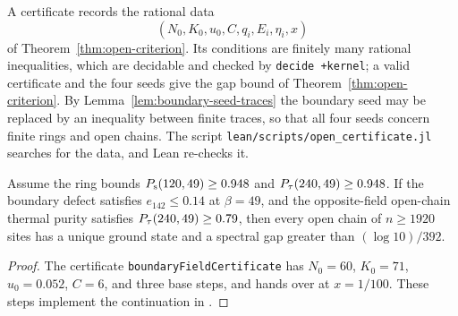 \begin{definition}
  \label{def:open-certificate}
  \leanok
  A certificate records the rational data
  \[
    (N_0, K_0, u_0, C, q_i, E_i, \eta_i, x)
  \]
  of Theorem~\ref{thm:open-criterion}.
  Its conditions are finitely many rational inequalities, which
  are decidable and checked by \texttt{decide +kernel}; a valid certificate and the four seeds give
  the gap bound of Theorem~\ref{thm:open-criterion}. By Lemma~\ref{lem:boundary-seed-traces} the
  boundary seed may be replaced by an inequality between finite traces, so that all four seeds
  concern finite rings and open chains. The script
  \texttt{lean/scripts/open\_certificate.jl} searches for the data, and Lean re-checks it.
\end{definition}

\begin{corollary}
  \label{cor:open-seeds-note}
  \leanok
  Assume the ring bounds \(P_{\mathrm{s}}(120, 49) \ge 0.948\) and \(P_{\tau}(240, 49) \ge 0.948\).
  If the boundary defect
  satisfies \(e_{142} \le 0.14\) at \(\beta = 49\), and the opposite-field open-chain thermal
  purity satisfies \(P_{\tau}(240, 49) \ge 0.79\), then every open chain of \(n \ge 1920\) sites has a
  unique ground state and a spectral gap greater than \((\log 10)/392\).
\end{corollary}
\begin{proof}
  \leanok
  The certificate \texttt{boundaryFieldCertificate} has \(N_0 = 60\), \(K_0 = 71\),
  \(u_0 = 0.052\), \(C = 6\), and three base steps, and hands over at \(x = 1/100\).
  These steps implement the continuation in \cite[Sections 5.2--5.3]{OpenAIBoundary}.
\end{proof}

